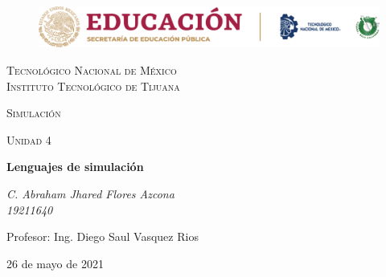 \documentclass[letterpaper, 12pt]{article}
\begin{document}
    
    \begin{titlepage}
        \begin{figure}[ht]
            \centering
            \includegraphics[width=15cm]{logosITT.png}
        \end{figure}
        \centering
        {\scshape\LARGE Tecnológico Nacional de México\\Instituto Tecnológico de Tijuana\par}
        \vspace{1cm}
        {\scshape\Large Simulación\par}
        \vspace{1cm}
        {\scshape\Large Unidad 4\par}
        \vspace{1.5cm}
        {\huge\bfseries Lenguajes de simulación\par}
        \vspace{2cm}
        {\Large\itshape C. Abraham Jhared Flores Azcona\\19211640\par}
        \vfill
        Profesor: Ing. Diego Saul Vasquez Rios\par
    
        \vfill

        {\large 26 de mayo de 2021}
    \end{titlepage}
\end{document}
